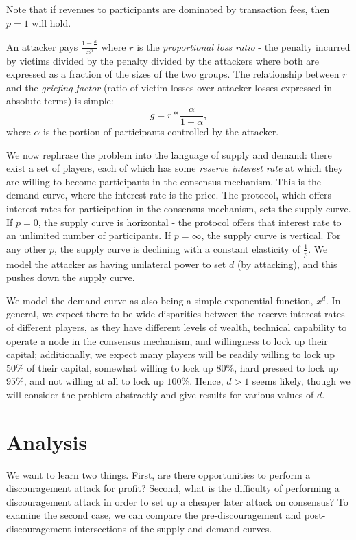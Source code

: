 \documentclass[12pt]{article}
\begin{document}
Note that if revenues to participants are dominated by transaction fees, then $p=1$ will hold.

An attacker pays $\frac{1-\frac{h}{r}}{x^p}$ where $r$ is the \textit{proportional loss ratio} - the penalty incurred by victims divided by the penalty divided by the attackers where both are expressed as a fraction of the sizes of the two groups. The relationship between $r$ and the \textit{griefing factor} (ratio of victim losses over attacker losses expressed in absolute terms) is simple: $$g = r * \frac{\alpha}{1-\alpha},$$ where $\alpha$ is the portion of participants controlled by the attacker.

We now rephrase the problem into the language of supply and demand: there exist a set of players, each of which has some \textit{reserve interest rate} at which they are willing to become participants in the consensus mechanism. This is the demand curve, where the interest rate is the price. The protocol, which offers interest rates for participation in the consensus mechanism, sets the supply curve. If $p=0$, the supply curve is horizontal - the protocol offers that interest rate to an unlimited number of participants. If $p=\infty$, the supply curve is vertical. For any other $p$, the supply curve is declining with a constant elasticity of $\frac{1}{p}$. We model the attacker as having unilateral power to set $d$ (by attacking), and this pushes down the supply curve.

We model the demand curve as also being a simple exponential function, $x^d$. In general, we expect there to be wide disparities between the reserve interest rates of different players, as they have different levels of wealth, technical capability to operate a node in the consensus mechanism, and willingness to lock up their capital; additionally, we expect many players will be readily willing to lock up $50\%$ of their capital, somewhat willing to lock up $80\%$, hard pressed to lock up $95\%$, and not willing at all to lock up $100\%$. Hence, $d > 1$ seems likely, though we will consider the problem abstractly and give results for various values of $d$.

\section{Analysis}

We want to learn two things. First, are there opportunities to perform a discouragement attack for profit? Second, what is the difficulty of performing a discouragement attack in order to set up a cheaper later attack on consensus? To examine the second case, we can compare the pre-discouragement and post-discouragement intersections of the supply and demand curves.
\end{document}
